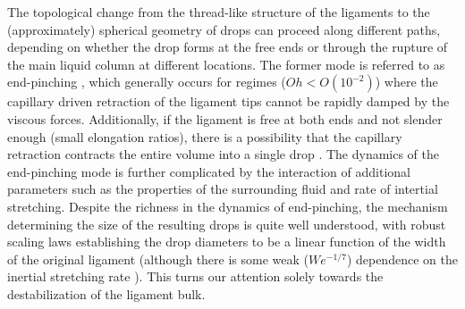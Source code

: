 The topological change from the thread-like structure of the ligaments to the 
(approximately) spherical geometry of drops can proceed along different paths, 
depending on whether the drop forms at the free ends or through the 
rupture of the main liquid column at different locations. 
The former mode is referred to as end-pinching \cite{end_pinch_1,end_pinch_2}, 
which generally occurs for regimes ($Oh < O(10^{-2})$) where the capillary driven
retraction of the ligament tips cannot be rapidly damped by the viscous forces. 
Additionally, if the ligament is free at both ends and not slender enough (small elongation ratios), 
there is a possibility that the capillary retraction contracts the entire volume into a single drop \cite{stone_1}. 
The dynamics of the end-pinching mode is further complicated by the interaction of 
additional parameters such as the properties of the surrounding fluid and rate of intertial stretching. 
Despite the richness in the dynamics of end-pinching, the mechanism determining the size of the resulting
drops is quite well understood, with robust scaling laws establishing the drop diameters to be a linear
function of the width of the original ligament \cite{end_pinch_1} (although there is some weak ($We^{-1/7}$) 
dependence on the inertial stretching rate \cite{end_pinch_3} ).
This turns our attention solely towards the destabilization of the ligament bulk. 


